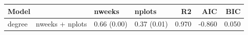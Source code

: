 \begin{tabular}{lllrrr}
\toprule
Model & nweeks & nplots & R2 & AIC & BIC \\
\midrule
degree ~ nweeks + nplots & 0.66 (0.00) & 0.37 (0.01) & 0.970 & -0.860 & 0.050 \\
\bottomrule
\end{tabular}
